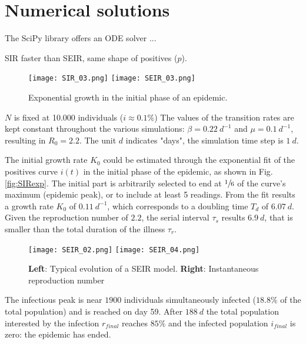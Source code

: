 \documentclass[DIV=12, BCOR=0pt]{scrartcl}  %
\begin{document}
	  
  
  \section{Numerical solutions}
	The SciPy library offers an ODE solver ...
	


	SIR faster than SEIR, same shape of positives ($p$).
	
		 \begin{figure}[h!]
		\centering
		\texttt{[image: SIR\_03.png]}
		\texttt{[image: SEIR\_03.png]}
		\caption{Exponential growth in the initial phase of an epidemic. }
		\label{fig:BothExp}
	\end{figure}

	$N$ is fixed at 10.000 individuals
	($i \approx 0.1 \%$)
	The values of the transition rates are kept constant throughout the various simulations: $\beta = 0.22 \ d^{-1}$ and $\mu = 0.1 \ d^{-1}$, resulting in $R_0 = 2.2$. The unit $d$ indicates "days", the simulation time step is $1 \ d$.



	The initial growth rate $K_0$ could be estimated through the exponential fit of the positives curve $i(t)$ in the initial phase of the epidemic, as shown in Fig. \ref{fig:SIRexp}. The initial part is arbitrarily selected to end at $\sfrac{1}{6}$ of the curve's maximum (epidemic peak), or to include at least 5 readings. From the fit results a growth rate $K_0$ of $0.11 \ d^{-1}$, which corresponds to a doubling time $T_{d}$ of $6.07 \ d$. Given the reproduction number of $2.2$, the serial interval $\tau_s$ results $6.9 \ d$, that is smaller than the total duration of the illness $\tau_{r}$.

	\begin{figure}[h!]
		\centering
		\texttt{[image: SEIR\_02.png]}
		\texttt{[image: SEIR\_04.png]}
		\caption{\textbf{Left}: Typical evolution of a SEIR model. \textbf{Right}: Instantaneous reproduction number }
		\label{fig:SIRtot}
	\end{figure}
	 
	The infectious peak is near $1900$ individuals simultaneously infected ($18.8 \%$ of the total population) and is reached on day 59. After $188 \ d$ the total population interested by the infection $r_{final}$ reaches $85 \%$ and the infected population $i_{final}$ is zero: the epidemic has ended. 
	
\end{document}
